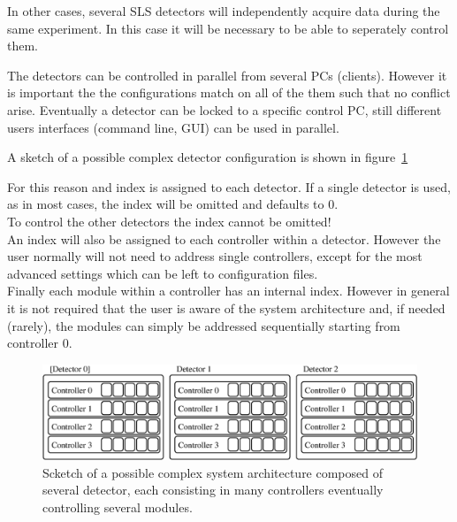 In other cases, several SLS detectors will independently acquire data during the same experiment. In this case it will be necessary to be able to seperately control them.

The detectors can be controlled in parallel from several PCs (clients). However it is important the the configurations match on all of the them such that no conflict arise. Eventually a detector can be locked to a specific control PC, still different users interfaces (command line, GUI) can be used in parallel.

A sketch of a possible complex detector configuration is shown in figure~\ref{fig:multidet}


For this reason and index is assigned to each detector. If a single detector is used, as in most cases, the index will be omitted and defaults to 0.\\
To control the other detectors the index cannot be omitted!\\


An index will also be assigned to each controller within a detector. However the user normally will not need to address single controllers, except for the most advanced settings which can be left to configuration files.\\


Finally each module within a controller has an internal index. However in general it is not required that the user is aware of the system architecture and, if needed (rarely), the modules can simply be addressed sequentially starting from controller 0.



\begin{figure}
\caption{Scketch of a possible complex system architecture composed of several detector, each consisting in many controllers eventually controlling several modules.}\label{fig:multidet}
\includegraphics[width=\textwidth]{multi_detector}
\end{figure} 


